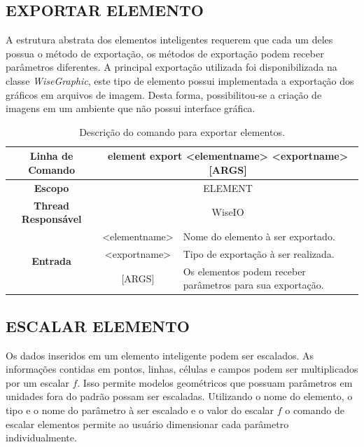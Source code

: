 \subsection{EXPORTAR ELEMENTO}\label{sec:export_element}

A estrutura abstrata dos elementos inteligentes requerem que cada um deles possua o método de exportação, os métodos de exportação podem receber parâmetros diferentes. A principal exportação utilizada foi disponibilizada na classe \textit{WiseGraphic}, este tipo de elemento possui implementada a exportação dos gráficos em arquivos de imagem. Desta forma, possibilitou-se a criação de imagens em um ambiente que não possui interface gráfica.

\begin{center}
	\begin{table}[!htbp]
		\begin{tabular}{|c|c|m{}|}
			\hline
			\textbf{Linha de Comando} & \multicolumn{2}{c|}{element export <element\underline{\space\space}name> <export\underline{\space\space}name> [ARGS]} \\
			\hline
			\textbf{Escopo} & \multicolumn{2}{c|}{ELEMENT} \\
			\hline
			\textbf{Thread Responsável} & \multicolumn{2}{c|}{WiseIO} \\
			\hline
			\multirow{3}{*}{\textbf{Entrada}} & <element\underline{\space\space}name> & Nome do elemento à ser exportado. \\
			& <export\underline{\space\space}name> & Tipo de exportação à ser realizada. \\
			& [ARGS] & Os elementos podem receber parâmetros para sua exportação. \\
			\hline
		\end{tabular}
		\caption{Descrição do comando para exportar elementos.}
		\label{tab:export}
	\end{table}
\end{center}

\subsection{ESCALAR ELEMENTO}\label{sec:scale_element}

Os dados inseridos em um elemento inteligente podem ser escalados. As informações contidas em pontos, linhas, células e campos podem ser multiplicados por um escalar $f$. Isso permite modelos geométricos que possuam parâmetros em unidades fora do padrão possam ser escaladas. Utilizando o nome do elemento, o tipo e o nome do parâmetro à ser escalado e o valor do escalar $f$ o comando de escalar elementos permite ao usuário dimensionar cada parâmetro individualmente.


